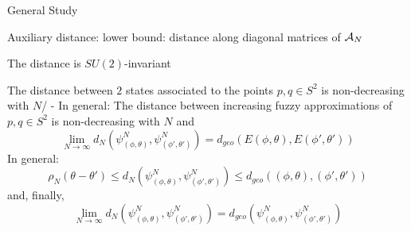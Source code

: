 \begin{frame}{General Study} %

Auxiliary distance: lower bound: distance along diagonal matrices of $\mathcal A_N$

The distance is $SU(2)$-invariant

The distance between $2$ states associated to the points $p, q \in S^2$ is non-decreasing with $N$/
- In general:
    The distance between increasing fuzzy approximations of $p, q \in S^2$ is non-decreasing with $N$ and
    \begin{equation}
        \lim_{N \to \infty} d_N(\psi^N_{(\phi, \theta)}, \psi^N_{(\phi', \theta')}) = d_{geo}(E(\phi, \theta), E(\phi', \theta'))
    \end{equation}
In general:
    \begin{equation}
        \rho_N(\theta - \theta') \leq d_N(\psi^N_{(\phi, \theta)}, \psi^N_{(\phi', \theta')}) \leq d_{geo}((\phi, \theta), (\phi', \theta'))
    \end{equation} and, finally,
    \begin{equation}
        \lim_{N \to \infty} d_N(\psi^N_{(\phi, \theta)}, \psi^N_{(\phi', \theta')}) = d_{geo}(\psi^N_{(\phi, \theta)}, \psi^N_{(\phi', \theta')})
    \end{equation}
\end{frame}

